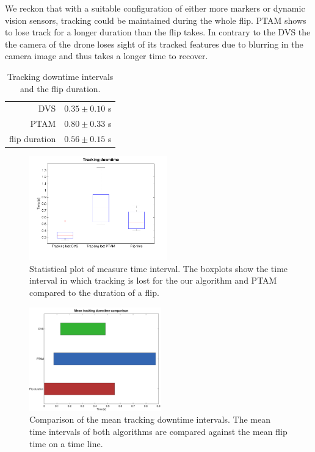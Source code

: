 We reckon that with a suitable configuration of either more markers
or dynamic vision sensors, tracking could be maintained during the
whole flip. PTAM shows to lose track for a longer duration than the
flip takes. In contrary to the DVS the the camera of the drone loses
sight of its tracked features due to blurring in the camera image
and thus takes a longer time to recover.

\begin{table}
\caption{\label{tab:downtime_tab} Tracking downtime intervals and the flip
duration.}
\centering %
\begin{tabular}{r|l}
\rule{0pt}{1em}DVS  & $0.35\pm0.10$ s\tabularnewline
PTAM  & $0.80\pm0.33$ s\tabularnewline
flip duration & $0.56\pm0.15$ s\tabularnewline
\end{tabular}
\end{table}


\begin{figure}[h]
\centering \includegraphics[height=4.5cm]{figures/flip_times} \caption{\label{img:fliptimes}Statistical plot of measure time interval. The
boxplots show the time interval in which tracking is lost for the
our algorithm and PTAM compared to the duration of a flip.}
\end{figure}


\begin{figure}[h]
\centering \includegraphics[height=4.5cm]{figures/mean_flip_times}
\caption{\label{img:mean_downtime} Comparison of the mean tracking downtime
intervals. The mean time intervals of both algorithms are compared
against the mean flip time on a time line.}
\end{figure}



